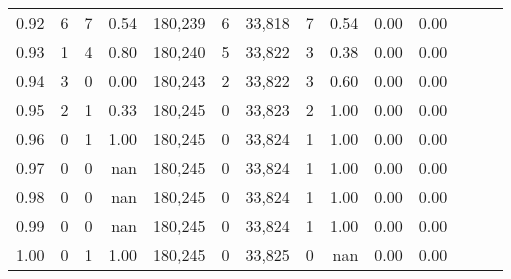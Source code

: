 \begin{tabular}{rrrrrrrrrrrrrr}
0.92 &      6 &    7 &  0.54 &  180,239 &        6 &  33,818 &       7 &  0.54 &  0.00 &      0.00 \\
0.93 &      1 &    4 &  0.80 &  180,240 &        5 &  33,822 &       3 &  0.38 &  0.00 &      0.00 \\
0.94 &      3 &    0 &  0.00 &  180,243 &        2 &  33,822 &       3 &  0.60 &  0.00 &      0.00 \\
0.95 &      2 &    1 &  0.33 &  180,245 &        0 &  33,823 &       2 &  1.00 &  0.00 &      0.00 \\
0.96 &      0 &    1 &  1.00 &  180,245 &        0 &  33,824 &       1 &  1.00 &  0.00 &      0.00 \\
0.97 &      0 &    0 &   nan &  180,245 &        0 &  33,824 &       1 &  1.00 &  0.00 &      0.00 \\
0.98 &      0 &    0 &   nan &  180,245 &        0 &  33,824 &       1 &  1.00 &  0.00 &      0.00 \\
0.99 &      0 &    0 &   nan &  180,245 &        0 &  33,824 &       1 &  1.00 &  0.00 &      0.00 \\
1.00 &      0 &    1 &  1.00 &  180,245 &        0 &  33,825 &       0 &   nan &  0.00 &      0.00 \\
\bottomrule
\end{tabular}
